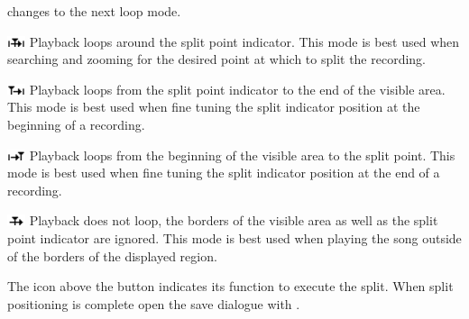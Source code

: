 \begin{description}
      changes to the next loop mode.
      \begin{description}
        \item
        \includegraphics[width=0.53cm]{plugins/images/icon-splitedit-loop-1}
          Playback loops around the split point indicator. This mode is best
          used when searching and zooming for the desired point at which to split
          the recording.
        \item
        \includegraphics[width=0.53cm]{plugins/images/icon-splitedit-loop-2}
          Playback loops from the split point indicator to the end of the
          visible area. This mode is best used when fine tuning the split
          indicator position at the beginning of a recording.
        \item
        \includegraphics[width=0.53cm]{plugins/images/icon-splitedit-loop-3}
          Playback loops from the beginning of the
          visible area to the split point. This mode is best used when fine
          tuning the split indicator position at the end of a recording.
        \item
        \includegraphics[width=0.53cm]{plugins/images/icon-splitedit-loop-4}
          Playback does not loop, the borders of the visible
          area as well as the split point indicator are ignored. This mode is
          best used when playing the song outside of the borders of the displayed
          region.
      \end{description}
    \item[Perform the split (8)]
          The icon above the
          button indicates its function to execute the split. When split
          positioning is complete open the save dialogue with
          .
  \end{description}

